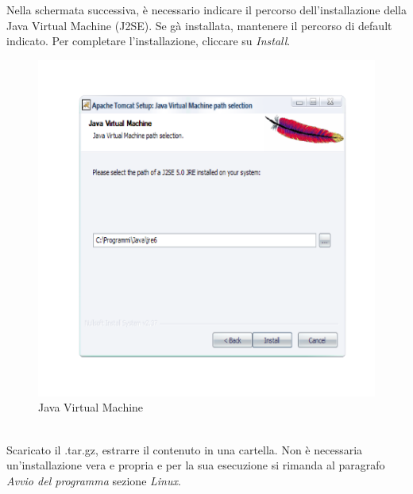 Nella schermata successiva, \`e necessario indicare il percorso dell'installazione della Java Virtual Machine (J2SE). Se g\`a  installata, mantenere il percorso di default indicato. Per completare l'installazione, cliccare su \textit{Install}.

\begin{figure}[!ht]
\centering
\includegraphics[scale=0.7]{images/InstallTomcat4.png}
\caption{Java Virtual Machine}
\end{figure} 

\\
Scaricato il .tar.gz, estrarre il contenuto in una cartella. Non \`e necessaria un'installazione vera e propria e per la sua esecuzione si rimanda al paragrafo \textit{Avvio del programma} sezione \textit{Linux}.

